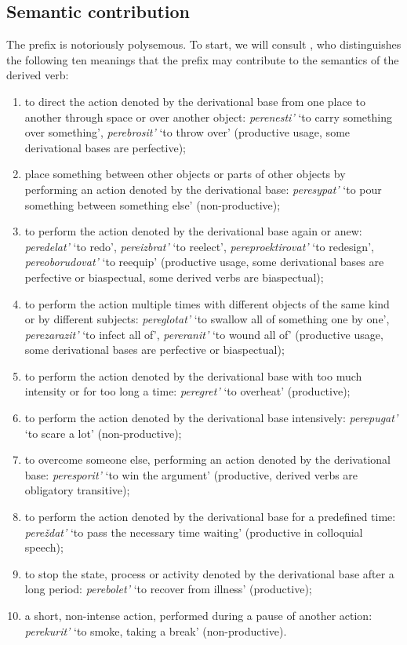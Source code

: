 \subsection{Semantic contribution}
The prefix  is notoriously polysemous. To start, we will consult \citet[pp. 363--364]{Shvedova:82}, who distinguishes the following ten meanings that the prefix may contribute to the semantics of the derived verb:
\begin{enumerate}
\item to direct the action denoted by the derivational base from one place to another through space or over another object: \textit{perenesti'} `to carry something over something', \textit{perebrosit'} `to throw over' (productive usage, some derivational bases are perfective); 
\item place something between other objects or parts of other objects by performing an action denoted by the derivational base: \textit{peresypat'} `to pour something between something else' (non-productive); 
\item to perform the action denoted by the derivational base again or anew: \textit{peredelat'} `to redo', \textit{pereizbrat'} `to reelect', \textit{pereproektirovat'} `to redesign', \textit{pereoborudovat'} `to reequip' (productive usage, some derivational bases are perfective or biaspectual, some derived verbs are biaspectual);
\item to perform the action multiple times with different objects of the same kind or by different subjects: \textit{pereglotat'} `to swallow all of something one by one', \textit{perezarazit'} `to infect all of', \textit{pereranit'} `to wound all of' (productive usage, some derivational bases are perfective or biaspectual);
\item to perform the action denoted by the derivational base with too much intensity or for too long a time: \textit{peregret'} `to overheat' (productive); 
\item to perform the action denoted by the derivational base intensively: \textit{perepugat'} `to scare a lot' (non-productive); 
\item to overcome someone else, performing an action denoted by the derivational base: \textit{peresporit'} `to win the argument' (productive, derived verbs are obligatory transitive); 
\item to perform the action denoted by the derivational base for a predefined time: \textit{pere\v{z}dat'} `to pass the necessary time waiting' (productive in colloquial speech);
\item to stop the state, process or activity denoted by the derivational base after a long period: \textit{perebolet'} `to recover from illness' (productive); 
\item a short, non-intense action, performed during a pause of another action: \textit{perekurit'} `to smoke, taking a break' (non-productive).
\end{enumerate} 

